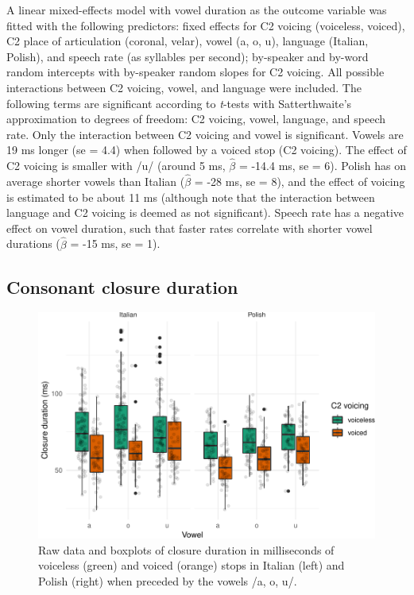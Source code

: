 \documentclass[preprint]{JASAnew}
\begin{document}
A linear mixed-effects model with vowel duration as the outcome variable
was fitted with the following predictors: fixed effects for C2 voicing
(voiceless, voiced), C2 place of articulation (coronal, velar), vowel
(a, o, u), language (Italian, Polish), and speech rate (as syllables per
second); by-speaker and by-word random intercepts with by-speaker random
slopes for C2 voicing. All possible interactions between C2 voicing,
vowel, and language were included. The following terms are significant
according to \emph{t}-tests with Satterthwaite's approximation to
degrees of freedom: C2 voicing, vowel, language, and speech rate. Only
the interaction between C2 voicing and vowel is significant. Vowels are
19 ms longer (se = 4.4) when followed by a voiced stop (C2 voicing). The
effect of C2 voicing is smaller with /u/ (around 5 ms, \(\hat{\beta}\) =
-14.4 ms, se = 6). Polish has on average shorter vowels than Italian
(\(\hat{\beta}\) = -28 ms, se = 8), and the effect of voicing is
estimated to be about 11 ms (although note that the interaction between
language and C2 voicing is deemed as not significant). Speech rate has a
negative effect on vowel duration, such that faster rates correlate with
shorter vowel durations (\(\hat{\beta}\) = -15 ms, se = 1).

\hypertarget{consonant-closure-duration}{%
\subsection{Consonant closure
duration}\label{consonant-closure-duration}}

\begin{figure}
\includegraphics[width=\linewidth]{2018-jasa_files/figure-latex/closure-plot-1} \caption{Raw data and boxplots of closure duration in milliseconds of voiceless (green) and voiced (orange) stops in Italian (left) and Polish (right) when preceded by the vowels /a, o, u/.}\label{f:closure-plot}
\end{figure}
\end{document}
